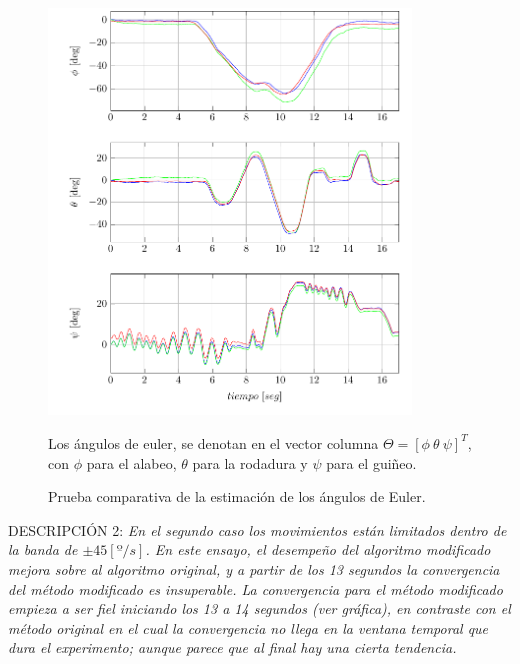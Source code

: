 \documentclass[conference]{IEEEtran}
\begin{document}
\begin{figure}
\begin{center}
\includegraphics[width=26em]{PlotAngles1.pdf}
\caption{Prueba comparativa de la estimación de los ángulos de Euler. }
\label{PlotPh1}
\scriptsize{Los ángulos de euler, se denotan en el vector columna $\Theta=[\phi~\theta~\psi]^T$, con $\phi$ para el alabeo, $\theta$ para la rodadura y $\psi$ para el guiñeo.}
\end{center}
\end{figure}
DESCRIPCIÓN 2: \textsl{En el segundo caso los movimientos están limitados dentro de la banda de $\pm45[º/s]$. En este ensayo, el desempeño del algoritmo modificado mejora sobre al algoritmo original, y a partir de los 13 segundos la convergencia del método modificado es insuperable. La convergencia para el método modificado empieza a ser fiel iniciando los 13 a 14 segundos (ver gráfica), en contraste con el método original en el cual la convergencia no llega en la ventana temporal que dura el experimento; aunque parece que al final hay una cierta tendencia.} \par
\end{document}
